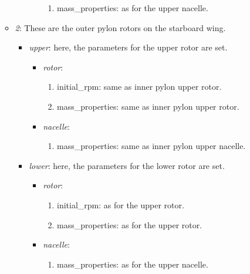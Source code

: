 \documentclass[report]{nrel}
\begin{document}
\begin{itemize}
\begin{itemize}
\begin{itemize}
\begin{itemize}
\begin{enumerate}
					\item {mass\_properties}:  as for the upper nacelle.  
				\end{enumerate}
		\end{itemize}
	\end{itemize}
	\item \emph{2}:	These are the outer pylon rotors  on the starboard wing.
	\begin{itemize}
		\item \emph{upper}: here, the parameters for the upper rotor are set.
		\begin{itemize}
			\item \emph{rotor}:
			\begin{enumerate}
				\item {initial\_rpm}: same as inner pylon upper rotor.
				\item {mass\_properties}: same as inner pylon upper rotor. 
			\end{enumerate}
			\item \emph{nacelle}:
			\begin{enumerate}
				\item {mass\_properties}:  same as inner pylon upper nacelle.
			\end{enumerate}
		\end{itemize}
		\item \emph{lower}: here, the parameters for the lower rotor are set.
		\begin{itemize}
			\item \emph{rotor}:
			\begin{enumerate}
				\item {initial\_rpm}: as for the upper rotor.
				\item {mass\_properties}: as for the upper rotor. 
			\end{enumerate}
			\item \emph{nacelle}:
			\begin{enumerate}
				\item {mass\_properties}:  as for the upper nacelle.  
			\end{enumerate}
		\end{itemize}
	\end{itemize}
	
\end{itemize}


\end{itemize}
\end{document}
